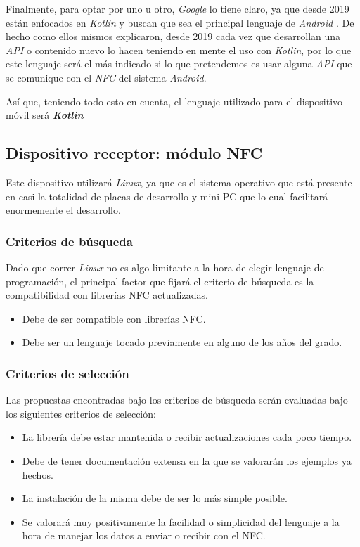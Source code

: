 Finalmente, para optar por uno u otro, \emph{Google} lo tiene claro, ya que desde 2019
están enfocados en \emph{Kotlin} y buscan que sea el principal lenguaje de \emph{Android}
\cite{prioridad-kotlin}. De hecho como ellos mismos explicaron, desde 2019 cada
vez que desarrollan una \emph{API} o contenido nuevo lo hacen teniendo en mente
el uso con \emph{Kotlin}, por lo que este lenguaje será el más indicado si lo que
pretendemos es usar alguna \emph{API} que se comunique con el \emph{NFC} del
sistema \emph{Android}.

Así que, teniendo todo esto en cuenta, el lenguaje utilizado para el
dispositivo móvil será \textbf{\emph{Kotlin}}

\subsection{Dispositivo receptor: módulo NFC}

Este dispositivo utilizará \emph{Linux}, ya que es el sistema operativo que está
presente en casi la totalidad de placas de desarrollo y mini PC que lo cual
facilitará enormemente el desarrollo. 

\subsubsection{Criterios de búsqueda}

Dado que correr \emph{Linux} no es algo limitante a la hora de elegir lenguaje de
programación, el principal factor que fijará el criterio de búsqueda es la
compatibilidad con librerías NFC actualizadas.

\begin{itemize}
    \item Debe de ser compatible con librerías NFC.
    \item Debe ser un lenguaje tocado previamente en alguno de los años del grado.
\end{itemize}

\subsubsection{Criterios de selección}

Las propuestas encontradas bajo los criterios de búsqueda serán evaluadas bajo
los siguientes criterios de selección:

\begin{itemize}
    \item La librería debe estar mantenida o recibir actualizaciones cada poco tiempo.
    \item Debe de tener documentación extensa en la que se valorarán los ejemplos ya hechos.
    \item La instalación de la misma debe de ser lo más simple posible.
    \item Se valorará muy positivamente la facilidad o simplicidad del lenguaje a la hora de manejar los datos a enviar o recibir con el NFC.
\end{itemize}

